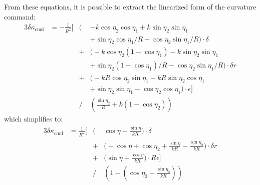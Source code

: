 \documentclass{article} %
\begin{document}
From these equations, it is possible to extract the linearized form of
the curvature command:
%
\begin{alignat}{3}
\delta \kappa_{\mathrm{cmd}} &= -\frac{1}{R^2} \bigg[&\bigg(&
-k \cos \eta_2 \cos \eta_1 + k \sin \eta_2 \sin \eta_1 \\
& && + \sin \eta_2 \cos \eta_1/R + \cos \eta_2 \sin \eta_1/R
\bigg) \cdot \delta \nonumber \\
%
& &+& \bigg(-k \cos \eta_2 (1 - \cos \eta_1) -
k \sin \eta_2 \sin \eta_1 \nonumber \\
& && + \sin \eta_2 (1 - \cos \eta_1)/R -
\cos \eta_2 \sin \eta_1 / R \bigg) \cdot \delta r \nonumber \\
%
& &+& \bigg(-kR \cos \eta_2 \sin \eta_1 -
kR \sin \eta_2 \cos \eta_1 \nonumber \\
& && + \sin \eta_2 \sin \eta_1 - \cos \eta_2 \cos \eta_1
\bigg) \cdot \epsilon \bigg] \nonumber \\
%
& &\bigg/& \left( \frac{\sin \eta_2}{R} + k (1 - \cos \eta_2) \right) \nonumber
\end{alignat}
%
which simplifies to:
\begin{alignat}{3}
\delta \kappa_{\mathrm{cmd}} &= \frac{1}{R^2} \bigg[&\bigg(&
\cos \eta - \frac{\sin \eta}{kR} \bigg) \cdot \delta \\
%
& &+& \bigg(-\cos \eta + \cos \eta_2
+ \frac{\sin \eta}{kR} - \frac{\sin \eta_2}{kR} \bigg) \cdot \delta r \nonumber \\
%
& &+& \bigg(\sin \eta + \frac{\cos \eta}{kR} \bigg) \cdot R \epsilon \bigg] \nonumber \\
%
& &\bigg/& \left( 1 - (\cos \eta_2 - \frac{\sin \eta_2}{kR}) \right) \nonumber
\end{alignat}
%
\end{document}
